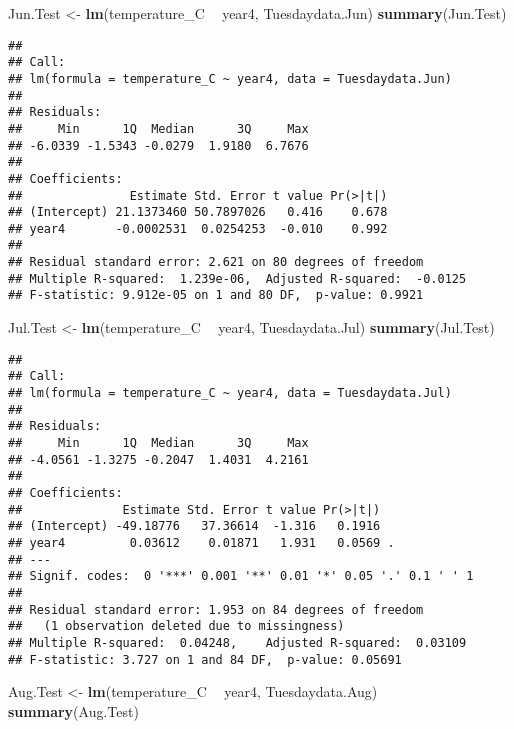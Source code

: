 \documentclass[]{article}
\newenvironment{Shaded}{\begin{snugshade}}{\end{snugshade}}
\newcommand{\KeywordTok}[1]{\textcolor[rgb]{0.13,0.29,0.53}{\textbf{#1}}}
\newcommand{\NormalTok}[1]{#1}
\newcommand{\OperatorTok}[1]{\textcolor[rgb]{0.81,0.36,0.00}{\textbf{#1}}}
\newcommand{\StringTok}[1]{\textcolor[rgb]{0.31,0.60,0.02}{#1}}
\begin{document}
\begin{Shaded}
\begin{Highlighting}[]
\NormalTok{Jun.Test <-}\StringTok{ }\KeywordTok{lm}\NormalTok{(temperature_C }\OperatorTok{~}\StringTok{ }\NormalTok{year4, Tuesdaydata.Jun)}
\KeywordTok{summary}\NormalTok{(Jun.Test)}
\end{Highlighting}
\end{Shaded}

\begin{verbatim}
## 
## Call:
## lm(formula = temperature_C ~ year4, data = Tuesdaydata.Jun)
## 
## Residuals:
##     Min      1Q  Median      3Q     Max 
## -6.0339 -1.5343 -0.0279  1.9180  6.7676 
## 
## Coefficients:
##               Estimate Std. Error t value Pr(>|t|)
## (Intercept) 21.1373460 50.7897026   0.416    0.678
## year4       -0.0002531  0.0254253  -0.010    0.992
## 
## Residual standard error: 2.621 on 80 degrees of freedom
## Multiple R-squared:  1.239e-06,  Adjusted R-squared:  -0.0125 
## F-statistic: 9.912e-05 on 1 and 80 DF,  p-value: 0.9921
\end{verbatim}

\begin{Shaded}
\begin{Highlighting}[]
\NormalTok{Jul.Test <-}\StringTok{ }\KeywordTok{lm}\NormalTok{(temperature_C }\OperatorTok{~}\StringTok{ }\NormalTok{year4, Tuesdaydata.Jul)}
\KeywordTok{summary}\NormalTok{(Jul.Test)}
\end{Highlighting}
\end{Shaded}

\begin{verbatim}
## 
## Call:
## lm(formula = temperature_C ~ year4, data = Tuesdaydata.Jul)
## 
## Residuals:
##     Min      1Q  Median      3Q     Max 
## -4.0561 -1.3275 -0.2047  1.4031  4.2161 
## 
## Coefficients:
##              Estimate Std. Error t value Pr(>|t|)  
## (Intercept) -49.18776   37.36614  -1.316   0.1916  
## year4         0.03612    0.01871   1.931   0.0569 .
## ---
## Signif. codes:  0 '***' 0.001 '**' 0.01 '*' 0.05 '.' 0.1 ' ' 1
## 
## Residual standard error: 1.953 on 84 degrees of freedom
##   (1 observation deleted due to missingness)
## Multiple R-squared:  0.04248,    Adjusted R-squared:  0.03109 
## F-statistic: 3.727 on 1 and 84 DF,  p-value: 0.05691
\end{verbatim}

\begin{Shaded}
\begin{Highlighting}[]
\NormalTok{Aug.Test <-}\StringTok{ }\KeywordTok{lm}\NormalTok{(temperature_C }\OperatorTok{~}\StringTok{ }\NormalTok{year4, Tuesdaydata.Aug)}
\KeywordTok{summary}\NormalTok{(Aug.Test)}
\end{Highlighting}
\end{Shaded}
\end{document}
